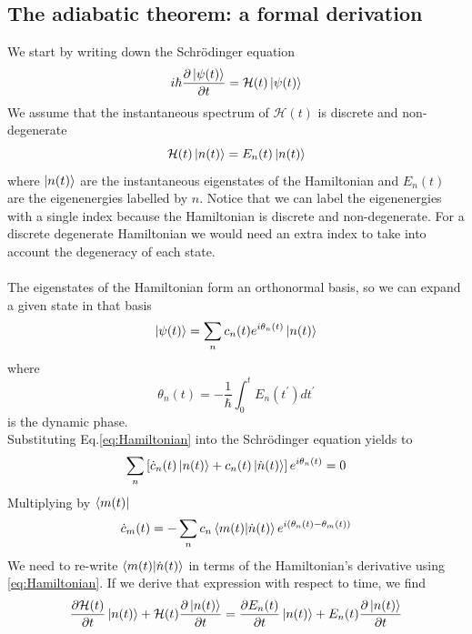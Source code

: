 \subsection{The adiabatic theorem: a formal derivation}
We start by writing down the Schrödinger equation
\begin{equation}
    i\hbar \frac{\partial \ket{\psi(t)}}{\partial t} = \mathcal{H}(t)\ket{\psi(t)}
\end{equation}
We assume that the instantaneous spectrum of $\mathcal{H}(t)$ is discrete and non-degenerate
\begin{equation}
\label{eq:Hamiltonian}
    \mathcal{H}(t) \ket{n(t)} = E_{n}(t)\ket{n(t)}
\end{equation}
where $\ket{n(t)}$ are the instantaneous eigenstates of the Hamiltonian and $E_{n}(t)$ are the eigenenergies labelled by $n$. Notice that we can label the eigenenergies with a single index because the Hamiltonian is discrete and non-degenerate. For a discrete degenerate Hamiltonian we would need an extra index to take into account the degeneracy of each state.\\\\
The eigenstates of the Hamiltonian form an orthonormal basis, so we can expand a given state in that basis
\begin{equation}
\label{eq: EigenvectorExpansion}
    \ket{\psi(t)} = \sum_{n}c_{n}(t)e^{i\theta_{n}(t)} \ket{n(t)}
\end{equation}
where
\begin{equation}
    \theta_{n}(t) = -\frac{1}{\hbar}\int_{0}^{t}E_{n}(t^{\prime})dt^{\prime}
\end{equation}
is the dynamic phase.\\
Substituting Eq.\ref{eq:Hamiltonian} into the Schrödinger equation yields to
\begin{equation}
    \sum_{n}\left[\dot{c}_{n}(t)\ket{n(t)} + c_{n}(t)\ket{\dot{n}(t)}\right]e^{i\theta_{n}(t)} = 0
\end{equation}
Multiplying by $\bra{m(t)}$
\begin{equation}
\label{eq:Coefficients}
    \dot{c}_{m}(t) = - \sum_{n}c_{n}\braket{m(t)|\dot{n}(t)}e^{i\left(\theta_{n}(t) - \theta_{m}(t)\right)}
\end{equation}
We need to re-write $\braket{m(t)|\dot{n}(t)}$ in terms of the Hamiltonian's derivative using \ref{eq:Hamiltonian}. If we derive that expression with respect to time, we find
\begin{equation}
    \frac{\partial \mathcal{H}(t)}{\partial t}\ket{n(t)} + \mathcal{H}(t)\frac{\partial \ket{n(t)}}{\partial t} = \frac{\partial E_{n}(t)}{\partial t} \ket{n(t)} + E_{n}(t)\frac{\partial \ket{n(t)}}{\partial t} 
\end{equation}
